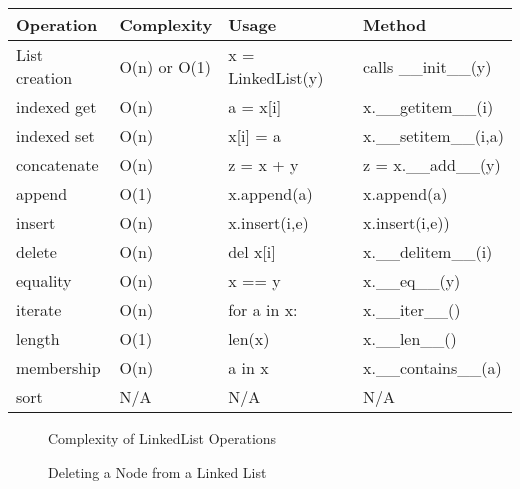 \documentclass[letterpaper,10pt,english]{sphinxmanual}
\begin{document}
\begin{savenotes}\sphinxattablestart
\centering
\begin{tabulary}{\linewidth}[t]{|T|T|T|T|}
\hline
\sphinxstyletheadfamily 
Operation
&\sphinxstyletheadfamily 
Complexity
&\sphinxstyletheadfamily 
Usage
&\sphinxstyletheadfamily 
Method
\\
\hline
List creation
&
O(n) or O(1)
&
x = LinkedList(y)
&
calls \_\_init\_\_(y)
\\
\hline
indexed get
&
O(n)
&
a = x{[}i{]}
&
x.\_\_getitem\_\_(i)
\\
\hline
indexed set
&
O(n)
&
x{[}i{]} = a
&
x.\_\_setitem\_\_(i,a)
\\
\hline
concatenate
&
O(n)
&
z = x + y
&
z = x.\_\_add\_\_(y)
\\
\hline
append
&
O(1)
&
x.append(a)
&
x.append(a)
\\
\hline
insert
&
O(n)
&
x.insert(i,e)
&
x.insert(i,e))
\\
\hline
delete
&
O(n)
&
del x{[}i{]}
&
x.\_\_delitem\_\_(i)
\\
\hline
equality
&
O(n)
&
x == y
&
x.\_\_eq\_\_(y)
\\
\hline
iterate
&
O(n)
&
for a in x:
&
x.\_\_iter\_\_()
\\
\hline
length
&
O(1)
&
len(x)
&
x.\_\_len\_\_()
\\
\hline
membership
&
O(n)
&
a in x
&
x.\_\_contains\_\_(a)
\\
\hline
sort
&
N/A
&
N/A
&
N/A
\\
\hline
\end{tabulary}
\par
\sphinxattableend\end{savenotes}

\begin{figure}[htbp]
\centering
\capstart

\noindent{}
\caption{Complexity of LinkedList Operations}\label{\detokenize{chap4/chap4:id11}}\end{figure}

\begin{figure}[htbp]
\centering
\capstart

\noindent{}
\caption{Deleting a Node from a Linked List}\label{\detokenize{chap4/chap4:id12}}\end{figure}
\end{document}
